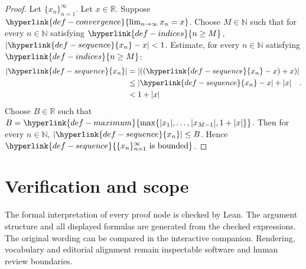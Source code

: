 \documentclass[11pt]{article}
\begin{document}
\begin{proof}Let $\{x_n\}_{n=1}^{\infty}$.
Let $x\in \mathbb{R}$.
Suppose $\hyperlink{def-convergence}{\lim_{n\to\infty} x_n = x}$.
Choose $M\in \mathbb{N}$ such that for every $n\in \mathbb{N}$ satisfying $\hyperlink{def-indices}{n\ge M}$, $\left|\hyperlink{def-sequence}{x_{n}} - x\right| < 1$.
Estimate, for every $n\in \mathbb{N}$ satisfying $\hyperlink{def-indices}{n\ge M}$:
\[ \begin{aligned}\left|\hyperlink{def-sequence}{x_{n}}\right| &= \left|\left(\left(\hyperlink{def-sequence}{x_{n}} - x\right) + x\right)\right| \\ &\le \left|\hyperlink{def-sequence}{x_{n}} - x\right| + \left|x\right| \\ &< 1 + \left|x\right|\end{aligned}. \]
Choose $B\in \mathbb{R}$ such that $B = \hyperlink{def-maximum}{\max\{ |x_1|,\ldots,|x_{M-1}|,1+|x|\}}$.
Then for every $n\in \mathbb{N}$, $\left|\hyperlink{def-sequence}{x_{n}}\right| \le B$.
Hence $\hyperlink{def-sequence}{\{x_n\}_{n=1}^{\infty}\text{ is bounded}}$.
\end{proof}
\section*{Verification and scope}
The formal interpretation of every proof node is checked by Lean. The argument structure and all displayed formulas are generated from the checked expressions. The original wording can be compared in the interactive companion. Rendering, vocabulary and editorial alignment remain inspectable software and human review boundaries.
\end{document}
